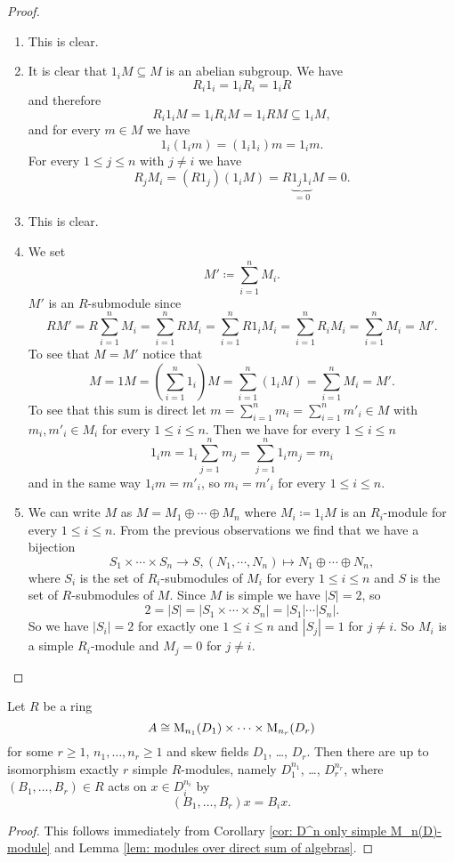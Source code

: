 \begin{proof}
 \begin{enumerate}[label=\emph{\alph*)},leftmargin=*]
  \item
   This is clear.
  \item
   It is clear that $1_i M \subseteq M$ is an abelian subgroup. We have
   \[
    R_i 1_i = 1_i R_i = 1_i R
   \]
   and therefore
   \[
    R_i 1_i M = 1_i R_i M = 1_i R M \subseteq 1_i M,
   \]
   and for every $m \in M$ we have
   \[
    1_i (1_i m) = (1_i 1_i) m = 1_i m.
   \]
   For every $1 \leq j \leq n$ with $j \neq i$ we have
   \[
    R_j M_i = (R 1_j) (1_i M) = R \underbrace{1_j 1_i}_{=0} M = 0.
   \]
  \item
   This is clear.
  \item
   We set
   \[
    M' \coloneqq \sum_{i=1}^n M_i.
   \]
   $M'$ is an $R$-submodule since
   \[
    R M'
    = R \sum_{i=1}^n M_i
    = \sum_{i=1}^n R M_i
    = \sum_{i=1}^n R 1_i M_i
    = \sum_{i=1}^n R_i M_i
    = \sum_{i=1}^n M_i
    = M'.
   \]
   To see that $M = M'$ notice that
   \[
    M
    = 1 M
    = \left( \sum_{i=1}^n 1_i \right) M
    = \sum_{i=1}^n (1_i M)
    = \sum_{i=1}^n M_i
    = M'.
   \]
   To see that this sum is direct let $m = \sum_{i=1}^n m_i = \sum_{i=1}^n m'_i \in M$ with $m_i, m'_i \in M_i$ for every $1 \leq i \leq n$. Then we have for every $1 \leq i \leq n$
   \[
    1_i m
    = 1_i \sum_{j=1}^n m_j
    = \sum_{j=1}^n 1_i m_j
    = m_i
   \]
   and in the same way $1_i m = m'_i$, so $m_i = m'_i$ for every $1 \leq i \leq n$.
  \item
   We can write $M$ as $M = M_1 \oplus \dotsb \oplus M_n$ where $M_i \coloneqq 1_i M$ is an $R_i$-module for every $1 \leq i \leq n$. From the previous observations we find that we have a bijection
   \[
    S_1 \times \dotsb \times S_n \to S, (N_1, \dotsb, N_n) \mapsto N_1 \oplus \dotsb \oplus N_n,
   \]
   where $S_i$ is the set of $R_i$-submodules of $M_i$ for every $1 \leq i \leq n$ and $S$ is the set of $R$-submodules of $M$. Since $M$ is simple we have $|S| = 2$, so
   \[
    2 = |S| = |S_1 \times \dotsb \times S_n| = |S_1| \dotsm |S_n|.
   \]
   So we have $|S_i| = 2$ for exactly one $1 \leq i \leq n$ and $|S_j| = 1$ for $j \neq i$. So $M_i$ is a simple $R_i$-module and $M_j = 0$ for $j \neq i$.
  \qedhere
 \end{enumerate}
\end{proof}


\begin{cor}\label{cor: simple modules over product of matrix algebras}
 Let $R$ be a ring
 \[
  A \cong \operatorname{M}_{n_1}(D_1) \times \dotsb \times \operatorname{M}_{n_r}(D_r)
 \]
 for some $r \geq 1$, $n_1, \dotsc, n_r \geq 1$ and skew fields $D_1$, \dots, $D_r$. Then there are up to isomorphism exactly $r$ simple $R$-modules, namely $D_1^{n_1}$, \dots, $D_r^{n_r}$, where $(B_1, \dotsc, B_r) \in R$ acts on $x \in D_i^{n_i}$ by
 \[
  (B_1, \dotsc, B_r) x =  B_i x.
 \]
\end{cor}
\begin{proof}
 This follows immediately from Corollary \ref{cor: D^n only simple M_n(D)-module} and Lemma \ref{lem: modules over direct sum of algebras}.
\end{proof}


